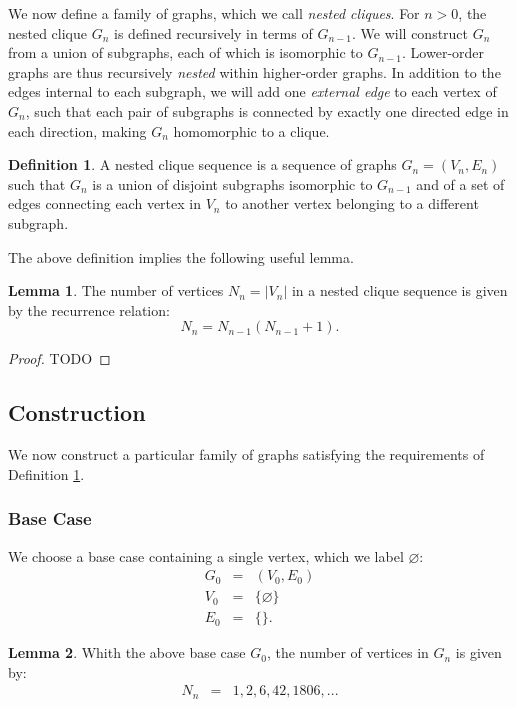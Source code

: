 \documentclass{article}
\theoremstyle{definition}
\newtheorem{definition}{Definition}[section]
\newtheorem{lemma}{Lemma}
\begin{document}
We now define a family of graphs, which we call {\em nested cliques}. For $n > 0$, the nested clique $G_n$ is defined recursively in terms of $G_{n-1}$. We will construct $G_n$ from a union of subgraphs, each of which is isomorphic to $G_{n-1}$. Lower-order graphs are thus recursively {\em nested} within higher-order graphs. In addition to the edges internal to each subgraph, we will add one {\em external edge} to each vertex of $G_n$, such that each pair of subgraphs is connected by exactly one directed edge in each direction, making $G_n$ homomorphic to a clique.

\begin{definition} \label{def:nk}
A {nested clique sequence} is a sequence of graphs $G_n = (V_n, E_n)$ such that $G_n$ is a union of disjoint subgraphs isomorphic to $G_{n-1}$ and of a set of edges connecting each vertex in $V_n$ to another vertex belonging to a different subgraph.
\end{definition}

The above definition implies the following useful lemma.
\begin{lemma}
The number of vertices $N_n = |V_n|$ in a nested clique sequence is given by the recurrence relation:
\begin{equation}\label{eq:nn}
N_n = N_{n-1}(N_{n-1} + 1).
\end{equation}
\end{lemma}

\begin{proof}
TODO
\end{proof}

\subsection{Construction}
We now construct a particular family of graphs satisfying the requirements of Definition \ref{def:nk}.

\subsubsection{Base Case}

We choose a base case containing a single vertex, which we label $\varnothing$:
\begin{eqnarray}
G_0 &=& (V_0, E_0) \\
V_0 &=& \{ \varnothing \} \\
E_0 &=& \{\}.
\end{eqnarray}

\begin{lemma}
Whith the above base case $G_0$, the number of vertices in $G_n$ is given by:
\begin{eqnarray}
N_n &=& 1, 2, 6, 42, 1806, ...
\end{eqnarray}
\end{lemma}
\end{document}
